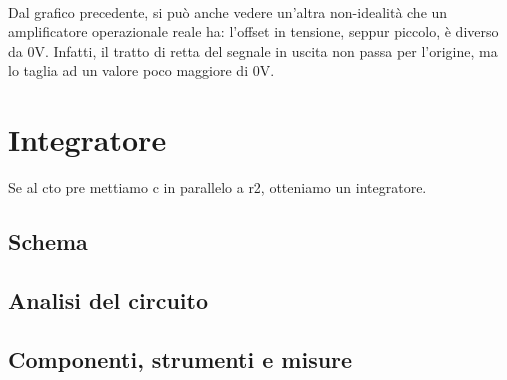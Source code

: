 \documentclass{report}
\begin{document}
\\Dal grafico precedente, si può anche vedere un'altra non-idealità che un amplificatore operazionale reale ha: l'offset in tensione, seppur piccolo, è diverso da 0V. Infatti, il tratto di retta del segnale in uscita non passa per l'origine, ma lo taglia ad un valore poco maggiore di 0V.
\section{Integratore} \label{int_cap}
Se al cto pre mettiamo c in parallelo a r2, otteniamo un integratore.
\subsection{Schema} %
\subsection{Analisi del circuito} 
\subsection{Componenti, strumenti e misure} 





\end{document}
